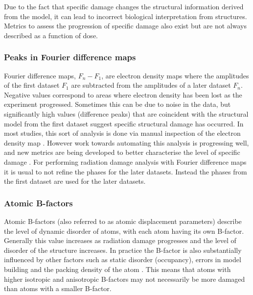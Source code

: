 		Due to the fact that specific damage changes the structural information derived from the model, it can lead to incorrect biological interpretation from structures.
		Metrics to assess the progression of specific damage also exist but are not always described as a function of dose.

        \subsubsection{Peaks in Fourier difference maps}
        \label{subs:Peaks in Fourier difference maps}
            Fourier difference maps, $F_n - F_1$, are electron density maps where the amplitudes of the first dataset $F_1$ are subtracted from the amplitudes of a later dataset $F_n$.
			Negative values correspond to areas where electron density has been lost as the experiment progressed.
			Sometimes this can be due to noise in the data, but significantly high values (difference peaks) that are coincident with the structural model from the first dataset suggest specific structural damage has occurred.
			In most studies, this sort of analysis is done via manual inspection of the electron density map \cite{burmeister2000structural,weik2000,ravelli2000}.
			However work towards automating this analysis is progressing well, and new metrics are being developed to better characterise the level of specific damage \cite{bury2015radiation}.
            For performing radiation damage analysis with Fourier difference maps it is usual to not refine the phases for the later datasets.
            Instead the phases from the first dataset are used for the later datasets.

        \subsubsection{Atomic B-factors}
        \label{subs:Atomic B-factors}
            Atomic B-factors (also referred to as atomic displacement parameters) describe the level of dynamic disorder of atoms, with each atom having its own B-factor.
			Generally this value increases as radiation damage progresses and the level of disorder of the structure increases.
			In practice the B-factor is also substantially influenced by other factors such as static disorder (occupancy), errors in model building and the packing density of the atom \cite{gerstel2015identifying}.
			This means that atoms with higher isotropic and anisotropic B-factors may not necessarily be more damaged than atoms with a smaller B-factor.

